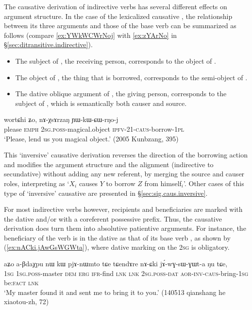 The causative derivation of indirective verbs has several different effects on argument structure. In the case of the lexicalized causative , the relationship between its three arguments and those of the base verb  can be summarized as follows (compare \ref{ex:YWkWCWrNoj} with \ref{ex:zYArNo} in §\ref{sec:ditransitive.indirective}).

\begin{itemize}
	\item The subject of , the receiving person, corresponds to the object of .
	\item The object of , the thing that is borrowed, corresponds to the semi-object of .
	\item The dative oblique argument of , the giving person, corresponds to the subject of , which is semantically both causer and source.
\end{itemize}

\begin{exe}
	\ex \label{ex:YWkWCWrNoj}
	\gll  wortɕhi ʑo, nɤ-χsɤrzaŋ ɲɯ-kɯ-ɕɯ-rŋo-j \\
	please \textsc{emph} \textsc{2sg}.\textsc{poss}-magical.object \textsc{ipfv}-2\fl{}1-\textsc{caus}-borrow-\textsc{1pl} \\
	\glt `Please, lend us you magical object.' (2005 Kunbzang, 395)
\end{exe}

This `inversive' causative derivation reverses the direction of the borrowing action and modifies the argument structure and the alignment (indirective to secundative) without adding any new referent, by merging the source and causer roles, interpreting  as `$X_i$ causes $Y$ to borrow $Z$ from himself$_i$'. Other cases of this type of `inversive' causative are presented in §\ref{sec:sig.caus.inversive}.

For most indirective verbs however, recipients and beneficiaries are marked with the dative and/or with a coreferent possessive prefix. Thus, the causative derivation does turn them into absolutive patientive arguments. For instance, the beneficiary of the verb  is in the dative as that of its base verb , as shown by (\ref{ex:nACki.jAwGsWGWta}), where dative marking on the \textsc{2sg} is obligatory.

\begin{exe}
	\ex \label{ex:nACki.jAwGsWGWta}
	\gll   aʑo a-βdaχpu nɯ kɯ pjɤ-nɯmto tɕe tɕendɤre nɤ-ɕki jɤ́-wɣ-sɯ-ɣɯt-a ŋu tɕe, \\
	\textsc{1sg} \textsc{1sg}.\textsc{poss}-master \textsc{dem} \textsc{erg} \textsc{ifr}-find \textsc{lnk} \textsc{lnk} \textsc{2sg}.\textsc{poss}-\textsc{dat} \textsc{aor}-\textsc{inv}-\textsc{caus}-bring-\textsc{1sg} be:\textsc{fact} \textsc{lnk} \\
	\glt `My master found it and sent me to bring it to you.' (140513 qianshang he xiaotou-zh, 72)
\end{exe}



